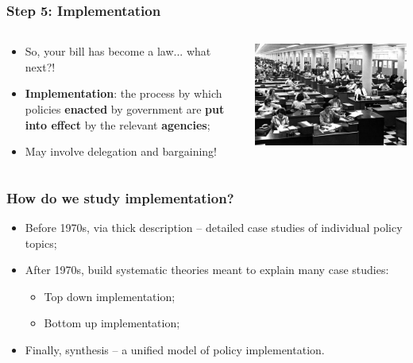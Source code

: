 \documentclass[aspectratio=169]{beamer}
\theoremstyle{principle}
\begin{document}
\begin{frame}
\frametitle{Step 5: Implementation}
\begin{columns}
\begin{column}{0.5\textwidth}

\begin{itemize}
\item So, your bill has become a law... what next?!
\bigskip
\bigskip
\bigskip
\item \textbf{Implementation}: the process by which policies \textbf{enacted} by government are \textbf{put into effect} by the relevant \textbf{agencies};
\bigskip
\bigskip
\bigskip
\item May involve delegation and bargaining!
\end{itemize}

\end{column}
\begin{column}{0.5\textwidth}
    \begin{center}
     \includegraphics[scale=0.4]{bureaucracy1.jpeg}
     \end{center}

\end{column}
\end{columns}

\end{frame}

\begin{frame}
\frametitle{How do we study implementation?}

\begin{itemize}
\item Before 1970s, via thick description -- detailed case studies of individual policy topics;
\bigskip
\bigskip
\item After 1970s, build systematic theories meant to explain many case studies:
\begin{itemize}
\item Top down implementation;
\item Bottom up implementation;
\end{itemize}
\bigskip
\bigskip
\item Finally, synthesis -- a unified model of policy implementation.
\end{itemize}

\end{frame}
\end{document}

